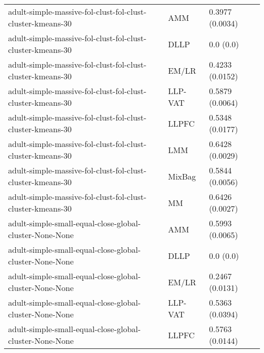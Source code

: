 \begin{longtable}{lll}
                                                   adult-simple-massive-fol-clust-fol-clust-cluster-kmeans-30 &       AMM &                           0.3977 (0.0034) \\
                                                   adult-simple-massive-fol-clust-fol-clust-cluster-kmeans-30 &      DLLP &                                 0.0 (0.0) \\
                                                   adult-simple-massive-fol-clust-fol-clust-cluster-kmeans-30 &     EM/LR &                           0.4233 (0.0152) \\
                                                   adult-simple-massive-fol-clust-fol-clust-cluster-kmeans-30 &   LLP-VAT &                           0.5879 (0.0064) \\
                                                   adult-simple-massive-fol-clust-fol-clust-cluster-kmeans-30 &     LLPFC &                           0.5348 (0.0177) \\
                                                   adult-simple-massive-fol-clust-fol-clust-cluster-kmeans-30 &       LMM &                           0.6428 (0.0029) \\
                                                   adult-simple-massive-fol-clust-fol-clust-cluster-kmeans-30 &    MixBag &                           0.5844 (0.0056) \\
                                                   adult-simple-massive-fol-clust-fol-clust-cluster-kmeans-30 &        MM &                           0.6426 (0.0027) \\
                                                      adult-simple-small-equal-close-global-cluster-None-None &       AMM &                           0.5993 (0.0065) \\
                                                      adult-simple-small-equal-close-global-cluster-None-None &      DLLP &                                 0.0 (0.0) \\
                                                      adult-simple-small-equal-close-global-cluster-None-None &     EM/LR &                           0.2467 (0.0131) \\
                                                      adult-simple-small-equal-close-global-cluster-None-None &   LLP-VAT &                           0.5363 (0.0394) \\
                                                      adult-simple-small-equal-close-global-cluster-None-None &     LLPFC &                           0.5763 (0.0144) \\

\end{longtable}
